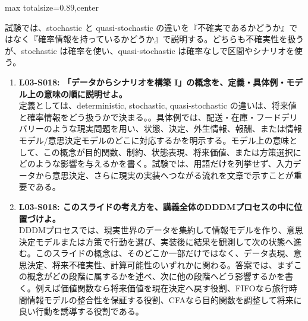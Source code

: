 \begin{minipage}[t]{0.58\textwidth}
\begin{adjustbox}{max totalsize={\textwidth}{0.89\textheight},center}
\begin{minipage}{\textwidth}
試験では、stochastic と quasi-stochastic の違いを『不確実であるかどうか』ではなく『確率情報を持っているかどうか』で説明する。どちらも不確実性を扱うが、stochastic は確率を使い、quasi-stochastic は確率なしで区間やシナリオを使う。\par{}\begin{enumerate}\item \textbf{L03-S018: 「データからシナリオを構築 I」の概念を、定義・具体例・モデル上の意味の順に説明せよ。}\\定義としては、deterministic, stochastic, quasi-stochastic の違いは、将来値と確率情報をどう扱うかで決まる。。具体例では、配送・在庫・フードデリバリーのような現実問題を用い、状態、決定、外生情報、報酬、または情報モデル/意思決定モデルのどこに対応するかを明示する。モデル上の意味として、この概念が目的関数、制約、状態表現、将来価値、または方策選択にどのような影響を与えるかを書く。試験では、用語だけを列挙せず、入力データから意思決定、さらに現実の実装へつながる流れを文章で示すことが重要である。\item \textbf{L03-S018: このスライドの考え方を、講義全体のDDDMプロセスの中に位置づけよ。}\\DDDMプロセスでは、現実世界のデータを集約して情報モデルを作り、意思決定モデルまたは方策で行動を選び、実装後に結果を観測して次の状態へ進む。このスライドの概念は、そのどこか一部だけではなく、データ表現、意思決定、将来不確実性、計算可能性のいずれかに関わる。答案では、まずこの概念がどの段階に属するかを述べ、次に他の段階へどう影響するかを書く。例えば価値関数なら将来価値を現在決定へ戻す役割、FIFOなら旅行時間情報モデルの整合性を保証する役割、CFAなら目的関数を調整して将来に良い行動を誘導する役割である。\end{enumerate}
\end{minipage}
\end{adjustbox}
\end{minipage}


